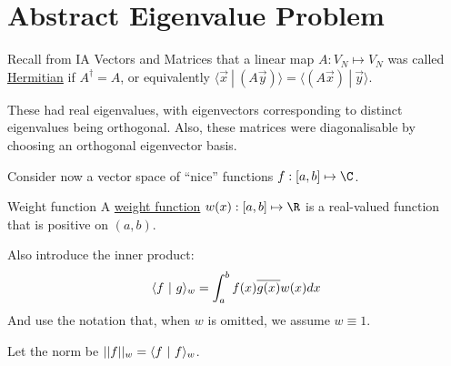 \documentclass[../Main.tex]{subfiles}
\begin{document}
\section{Abstract Eigenvalue Problem}
Recall from IA Vectors and Matrices that a linear map $A : V_N \mapsto V_N$ was called \underline{Hermitian} if $A^\dagger = A$, or equivalently $\langle\vec{x} ~|~(A\vec{y})\rangle = \langle(A \vec{x}) ~|~ \vec{y}\rangle$.

These had real eigenvalues, with eigenvectors corresponding to distinct eigenvalues being orthogonal. Also, these matrices were diagonalisable by choosing an orthogonal eigenvector basis.

Consider now a vector space of ``nice'' functions $f : [a, b] \mapsto \C$.\begin{definition}{Weight function}
    A \underline{weight function} $w(x) : [a, b] \mapsto \R$ is a real-valued function that is positive on $(a, b)$.
\end{definition}
Also introduce the inner product:
\begin{equation}
    \langle f~\vert~g\rangle_w = \int_{a}^{b} f(x) \overline{g(x)} w(x) dx 
    \label{eqnInnerFuncProduct}
\end{equation}
And use the notation that, when $w$ is omitted, we assume $w \equiv 1$.

Let the norm be $||f||_w = \langle f~\vert~f\rangle_w$.
\end{document}
